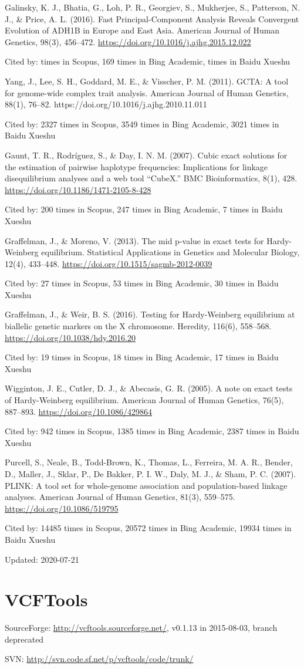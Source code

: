 \documentclass[]{article}
\newcommand{\cb}[3]{\par Cited by: {\color{blue}\Huge #1} times in Scopus, {\color{blue}\Huge #2} times in Bing Academic, {\color{blue}\Huge #3} times in Baidu Xueshu}
\begin{document}
Galinsky, K. J., Bhatia, G., Loh, P. R., Georgiev, S., Mukherjee, S., Patterson, N. J., \& Price, A. L. (2016). Fast Principal-Component Analysis Reveals Convergent Evolution of ADH1B in Europe and East Asia. American Journal of Human Genetics, 98(3), 456–472. \url{https://doi.org/10.1016/j.ajhg.2015.12.022}\cb{}{169}{}

Yang, J., Lee, S. H., Goddard, M. E., \& Visscher, P. M. (2011). GCTA: A tool for genome-wide complex trait analysis. American Journal of Human Genetics, 88(1), 76–82. {https://doi.org/10.1016/j.ajhg.2010.11.011}\cb{2327}{3549}{3021}

Gaunt, T. R., Rodríguez, S., \& Day, I. N. M. (2007). Cubic exact solutions for the estimation of pairwise haplotype frequencies: Implications for linkage disequilibrium analyses and a web tool ``CubeX.'' BMC Bioinformatics, 8(1), 428. \url{https://doi.org/10.1186/1471-2105-8-428}\cb{200}{247}{7}

Graffelman, J., \& Moreno, V. (2013). The mid p-value in exact tests for Hardy-Weinberg equilibrium. Statistical Applications in Genetics and Molecular Biology, 12(4), 433–448. \url{https://doi.org/10.1515/sagmb-2012-0039}\cb{27}{53}{30}

Graffelman, J., \& Weir, B. S. (2016). Testing for Hardy-Weinberg equilibrium at biallelic genetic markers on the X chromosome. Heredity, 116(6), 558–568. \url{https://doi.org/10.1038/hdy.2016.20}\cb{19}{18}{17}

Wigginton, J. E., Cutler, D. J., \& Abecasis, G. R. (2005). A note on exact tests of Hardy-Weinberg equilibrium. American Journal of Human Genetics, 76(5), 887–893. \url{https://doi.org/10.1086/429864}\cb{942}{1385}{2387}

Purcell, S., Neale, B., Todd-Brown, K., Thomas, L., Ferreira, M. A. R., Bender, D., Maller, J., Sklar, P., De Bakker, P. I. W., Daly, M. J., \& Sham, P. C. (2007). PLINK: A tool set for whole-genome association and population-based linkage analyses. American Journal of Human Genetics, 81(3), 559–575. \url{https://doi.org/10.1086/519795}\cb{14485}{20572}{19934}

Updated: 2020-07-21

\section{VCFTools}

SourceForge: \url{http://vcftools.sourceforge.net/}, v0.1.13 in 2015-08-03, branch deprecated

SVN: \url{http://svn.code.sf.net/p/vcftools/code/trunk/}
\end{document}
